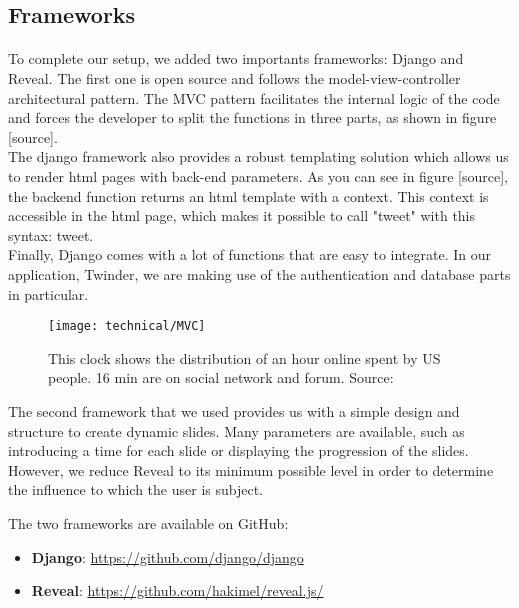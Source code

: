 \subsection{Frameworks}

\paragraph{}
To complete our setup, we added two importants frameworks: Django and Reveal. The first one 
is open source and follows the model-view-controller architectural pattern. The MVC pattern facilitates the internal logic of the code and forces the developer to split the functions in three parts, as shown in figure [source]. \\
The django framework also provides a robust templating solution which allows us to render html pages with back-end parameters. As you can see in figure [source], the backend function returns an html template with a context. This context is accessible in the html page, which makes it possible to call "tweet" with this syntax: {{tweet}}.\\
Finally, Django comes with a lot of functions that are easy to integrate. In our application, Twinder, we are making use of the authentication and database parts in particular.



\begin{figure}[h] 
\centering 
\texttt{[image: technical/MVC]} 
\caption[Time spent of Social Media]{This clock shows the distribution of an hour online spent by US people. 16 min are on social network and forum. Source: \cite{s_clock}}
\label{fig:tinder} 
\end{figure}

The second framework that we used provides us with a simple design and structure to create dynamic slides. Many parameters are available, such as introducing a time for each slide or displaying the progression of the slides. However, we reduce Reveal to its minimum possible level in order to determine the influence to which the user is subject.

The two frameworks are available on GitHub: 
\begin{itemize}
  \item \textbf{Django}: \url{https://github.com/django/django}
  \item \textbf{Reveal}: \url{https://github.com/hakimel/reveal.js/}
\end{itemize}

